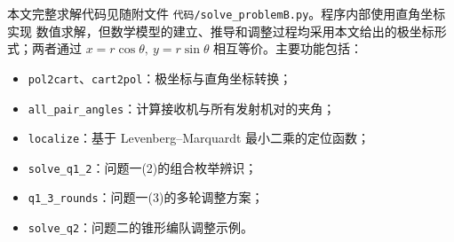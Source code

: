 \documentclass[UTF8,a4paper,11pt]{ctexart}
\begin{document}
本文完整求解代码见随附文件 \texttt{代码/solve\_problemB.py}。程序内部使用直角坐标实现
数值求解，但数学模型的建立、推导和调整过程均采用本文给出的极坐标形式；两者通过
$x=r\cos\theta,\ y=r\sin\theta$ 相互等价。主要功能包括：
\begin{itemize}
  \item \texttt{pol2cart}、\texttt{cart2pol}：极坐标与直角坐标转换；
  \item \texttt{all\_pair\_angles}：计算接收机与所有发射机对的夹角；
  \item \texttt{localize}：基于 Levenberg--Marquardt 最小二乘的定位函数；
  \item \texttt{solve\_q1\_2}：问题一(2)的组合枚举辨识；
  \item \texttt{q1\_3\_rounds}：问题一(3)的多轮调整方案；
  \item \texttt{solve\_q2}：问题二的锥形编队调整示例。
\end{itemize}
\end{document}
